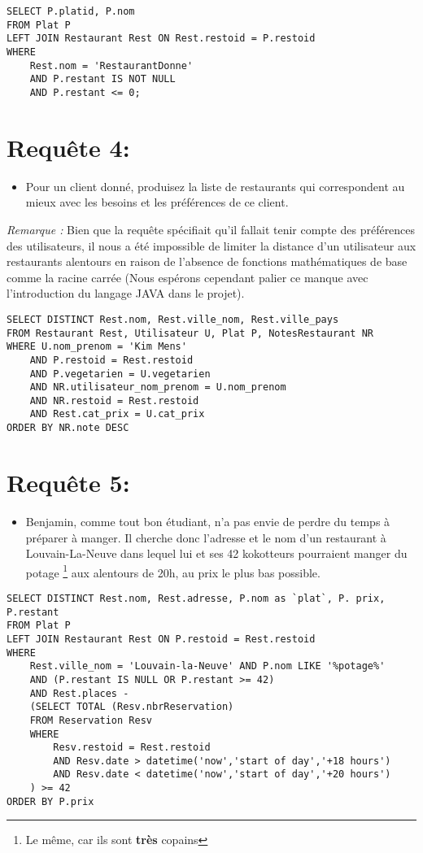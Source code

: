 \documentclass[a4paper, 12pt]{article}
\begin{document}
\begin{lstlisting} 
SELECT P.platid, P.nom 
FROM Plat P
LEFT JOIN Restaurant Rest ON Rest.restoid = P.restoid
WHERE 
	Rest.nom = 'RestaurantDonne'
	AND P.restant IS NOT NULL
	AND P.restant <= 0;
\end{lstlisting}

\section*{Requête 4:}

\begin{itemize}
\item Pour un client donné, produisez la liste de restaurants qui correspondent au mieux avec les besoins et les préférences de ce client.
\end{itemize}
\emph{Remarque :} Bien que la requête spécifiait qu'il fallait tenir compte des préférences des utilisateurs, il nous a été impossible de limiter la distance d'un utilisateur aux restaurants alentours en raison de l'absence de fonctions mathématiques de base comme la racine carrée (Nous espérons cependant palier ce manque avec l'introduction du langage JAVA dans le projet).

\begin{lstlisting} 
SELECT DISTINCT Rest.nom, Rest.ville_nom, Rest.ville_pays
FROM Restaurant Rest, Utilisateur U, Plat P, NotesRestaurant NR
WHERE U.nom_prenom = 'Kim Mens'
	AND P.restoid = Rest.restoid
	AND P.vegetarien = U.vegetarien
	AND NR.utilisateur_nom_prenom = U.nom_prenom
	AND NR.restoid = Rest.restoid
	AND Rest.cat_prix = U.cat_prix
ORDER BY NR.note DESC
\end{lstlisting}

\section*{Requête 5:}

\begin{itemize}
\item Benjamin, comme tout bon étudiant, n'a pas envie de perdre du temps à préparer à manger. Il cherche donc l'adresse et le nom d'un restaurant à Louvain-La-Neuve dans lequel lui et ses 42 kokotteurs pourraient manger du potage \footnote{Le même, car ils sont \textbf{très} copains} aux alentours de 20h, au prix le plus bas possible.
\end{itemize}

\begin{lstlisting} 
SELECT DISTINCT Rest.nom, Rest.adresse, P.nom as `plat`, P. prix, P.restant
FROM Plat P
LEFT JOIN Restaurant Rest ON P.restoid = Rest.restoid
WHERE 
	Rest.ville_nom = 'Louvain-la-Neuve' AND P.nom LIKE '%potage%'
	AND (P.restant IS NULL OR P.restant >= 42)
	AND Rest.places -
	(SELECT TOTAL (Resv.nbrReservation) 
	FROM Reservation Resv
	WHERE 
		Resv.restoid = Rest.restoid
		AND Resv.date > datetime('now','start of day','+18 hours') 
		AND Resv.date < datetime('now','start of day','+20 hours')
	) >= 42
ORDER BY P.prix
\end{lstlisting}
\end{document}
